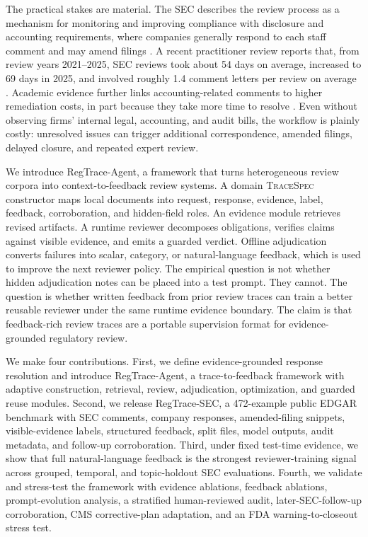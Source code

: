 \documentclass[11pt]{article}
\newcommand{\task}{evidence-grounded response resolution}
\newcommand{\dataset}{RegTrace-SEC}
\newcommand{\framework}{RegTrace-Agent}
\begin{document}
The practical stakes are material. The SEC describes the review process as a mechanism for monitoring and improving compliance with disclosure and accounting requirements, where companies generally respond to each staff comment and may amend filings \citep{sec2026edgarcorrespondence}. A recent practitioner review reports that, from review years 2021--2025, SEC reviews took about 54 days on average, increased to 69 days in 2025, and involved roughly 1.4 comment letters per review on average \citep{deloitte2026commentletters}. Academic evidence further links accounting-related comments to higher remediation costs, in part because they take more time to resolve \citep{cassell2013sec}. Even without observing firms' internal legal, accounting, and audit bills, the workflow is plainly costly: unresolved issues can trigger additional correspondence, amended filings, delayed closure, and repeated expert review.

We introduce \framework{}, a framework that turns heterogeneous review corpora into context-to-feedback review systems. A domain \textsc{TraceSpec} constructor maps local documents into request, response, evidence, label, feedback, corroboration, and hidden-field roles. An evidence module retrieves revised artifacts. A runtime reviewer decomposes obligations, verifies claims against visible evidence, and emits a guarded verdict. Offline adjudication converts failures into scalar, category, or natural-language feedback, which is used to improve the next reviewer policy. The empirical question is not whether hidden adjudication notes can be placed into a test prompt. They cannot. The question is whether written feedback from prior review traces can train a better reusable reviewer under the same runtime evidence boundary. The claim is that feedback-rich review traces are a portable supervision format for evidence-grounded regulatory review.

We make four contributions. First, we define \task{} and introduce \framework{}, a trace-to-feedback framework with adaptive construction, retrieval, review, adjudication, optimization, and guarded reuse modules. Second, we release \dataset{}, a 472-example public EDGAR benchmark with SEC comments, company responses, amended-filing snippets, visible-evidence labels, structured feedback, split files, model outputs, audit metadata, and follow-up corroboration. Third, under fixed test-time evidence, we show that full natural-language feedback is the strongest reviewer-training signal across grouped, temporal, and topic-holdout SEC evaluations. Fourth, we validate and stress-test the framework with evidence ablations, feedback ablations, prompt-evolution analysis, a stratified human-reviewed audit, later-SEC-follow-up corroboration, CMS corrective-plan adaptation, and an FDA warning-to-closeout stress test.
\end{document}
